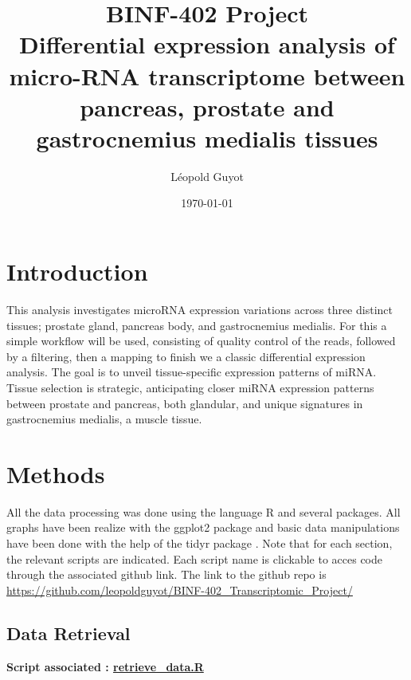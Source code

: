 \documentclass[a4paper, 11pt]{article}
\title{\Large BINF-402 Project \\
\huge Differential expression analysis of micro-RNA transcriptome between pancreas, prostate and gastrocnemius medialis tissues}
\author{Léopold Guyot}
\date{\today}
\begin{document}
\pagestyle{fancy}
\setlength{\headheight}{32.3pt}
\fancyhead{}\fancyfoot{}
\fancyfoot[R]{\thepage}

\maketitle

\begin{multicols}{2}
\section{Introduction}
This analysis investigates microRNA expression variations across three distinct tissues; prostate gland, pancreas body, and gastrocnemius medialis. For this a simple workflow will be used, consisting of quality control of the reads, followed by a filtering, then a mapping to finish we a classic differential expression analysis. The goal is to unveil tissue-specific expression patterns of miRNA. Tissue selection is strategic, anticipating closer miRNA expression patterns between prostate and pancreas, both glandular, and unique signatures in gastrocnemius medialis, a muscle tissue.

\section{Methods}
All the data processing was done using the language R \citep{Rlang} and several packages. All graphs have been realize with the ggplot2 package \citep{ggplot2} and basic data manipulations have been done with the help of the tidyr package \citep{tidyr}. Note that for each section, the relevant scripts are indicated. Each script name is clickable to acces code through the associated github link. The link to the github repo is
{\scriptsize \href{https://github.com/leopoldguyot/BINF-402_Transcriptomic_Project/}{https://github.com/leopoldguyot/BINF-402\_Transcriptomic\_Project/}}
\subsection{Data Retrieval}
\begin{scriptsize}
	\textbf{Script associated : \href{https://github.com/leopoldguyot/BINF-402_Transcriptomic_Project/blob/main/retrieve_data.R}{retrieve\_data.R}}
\end{scriptsize}




\end{multicols}
\end{document}
